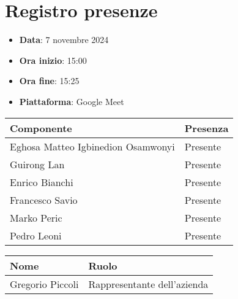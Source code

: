 \documentclass[a4paper, 12pt]{article}
\def\data-verbale{7 novembre 2024}
\begin{document}
\section{Registro presenze}
\begin{itemize}
    \item[] \textbf{Data}: \data-verbale
    \item[] \textbf{Ora inizio}:  15:00
    \item[] \textbf{Ora fine}: 15:25
    \item[] \textbf{Piattaforma}: Google Meet	
\end{itemize}
\begin{table}[!h]
\centering
{\renewcommand{\arraystretch}{2}
\begin{tabularx}{\textwidth}{| X | X |}
    \hline
        \textbf{\large Componente} & 
        \textbf{\large Presenza} \\ 
    \hline 
    \hline
        Eghosa Matteo Igbinedion Osamwonyi&
        Presente \\
    \hline 
        Guirong Lan&
        Presente \\
    \hline 
        Enrico Bianchi&
        Presente \\
    \hline 
        Francesco Savio&
        Presente \\
    \hline 
        Marko Peric&
        Presente \\
    \hline 
        Pedro Leoni&
        Presente \\
    \hline 

\end{tabularx}}
\end{table}

\begin{table}[!h]
    \centering
    {\renewcommand{\arraystretch}{2}
    \begin{tabularx}{\textwidth}{| X | X |}
        \hline
            \textbf{\large Nome} & 
            \textbf{\large Ruolo} \\ 
        \hline 
        \hline
            Gregorio Piccoli&
            Rappresentante dell'azienda \\
        \hline 
    
    \end{tabularx}}
\end{table}

\newpage
\end{document}
